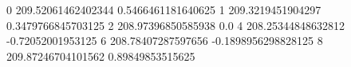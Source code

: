 0 209.52061462402344 0.5466461181640625
1 209.3219451904297 0.3479766845703125
2 208.97396850585938 0.0
4 208.25344848632812 -0.72052001953125
6 208.78407287597656 -0.1898956298828125
8 209.87246704101562 0.89849853515625
